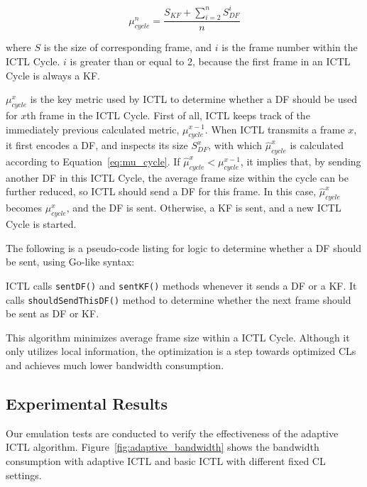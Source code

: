 \documentclass[12pt]{report}
\begin{document}
\begin{equation}
  \mu_{cycle}^n = \frac{S_{KF} + \sum_{i=2}^{n}{S_{DF}^i}}{n}
  \label{eq:mu_cycle}
\end{equation}

where $S$ is the size of corresponding frame, and $i$ is the frame number within the ICTL Cycle. $i$ is greater than or equal to 2, because the first frame in an ICTL Cycle is always a KF.

$\mu_{cycle}^x$ is the key metric used by ICTL to determine whether a DF should be used for $x$th frame in the ICTL Cycle. First of all, ICTL keeps track of the immediately previous calculated metric, $\mu_{cycle}^{x-1}$. When ICTL transmits a frame $x$, it first encodes a DF, and inspects its size $S_{DF}^x$, with which $\hat{\mu}_{cycle}^x$ is calculated according to Equation~\ref{eq:mu_cycle}. If $\hat{\mu}_{cycle}^x < \mu_{cycle}^{x-1}$, it implies that, by sending another DF in this ICTL Cycle, the average frame size within the cycle can be further reduced, so ICTL should send a DF for this frame. In this case, $\hat{\mu}_{cycle}^x$ becomes $\mu_{cycle}^x$, and the DF is sent. Otherwise, a KF is sent, and a new ICTL Cycle is started.

The following is a pseudo-code listing for logic to determine whether a DF should be sent, using Go-like syntax:

\begin{singlespace}
  
\end{singlespace}

ICTL calls \texttt{sentDF()} and \texttt{sentKF()} methods whenever it sends a DF or a KF. It calls \texttt{shouldSendThisDF()} method to determine whether the next frame should be sent as DF or KF.

This algorithm minimizes average frame size within a ICTL Cycle. Although it only utilizes local information, the optimization is a step towards optimized CLs and achieves much lower bandwidth consumption.

\subsection{Experimental Results}

Our emulation tests are conducted to verify the effectiveness of the adaptive ICTL algorithm. Figure~\ref{fig:adaptive_bandwidth} shows the bandwidth consumption with adaptive ICTL and basic ICTL with different fixed CL settings.
\end{document}
